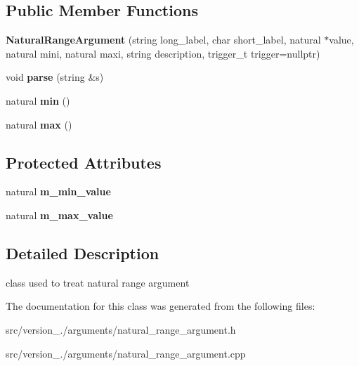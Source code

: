 \subsection*{Public Member Functions}
\begin{DoxyCompactItemize}
\item 
\mbox{\label{classez_1_1arguments_1_1NaturalRangeArgument_a16738801e279e57022d75f1ed6f5dbf3}} 
{\bfseries Natural\+Range\+Argument} (string long\+\_\+label, char short\+\_\+label, natural $\ast$value, natural mini, natural maxi, string description, trigger\+\_\+t trigger=nullptr)
\item 
\mbox{\label{classez_1_1arguments_1_1NaturalRangeArgument_a56ec8cbcb21b96c1594bffa79e44e206}} 
void {\bfseries parse} (string \&s)
\item 
\mbox{\label{classez_1_1arguments_1_1NaturalRangeArgument_aadd923d1d6da5e6cf484f0d1922dde30}} 
natural {\bfseries min} ()
\item 
\mbox{\label{classez_1_1arguments_1_1NaturalRangeArgument_ada5d4bfd607176307753f218190a10c4}} 
natural {\bfseries max} ()
\end{DoxyCompactItemize}
\subsection*{Protected Attributes}
\begin{DoxyCompactItemize}
\item 
\mbox{\label{classez_1_1arguments_1_1NaturalRangeArgument_addc2eab39211438abb76d9e50071f7b8}} 
natural {\bfseries m\+\_\+min\+\_\+value}
\item 
\mbox{\label{classez_1_1arguments_1_1NaturalRangeArgument_a5f0fc979e40fc85b9789368cc4cb93c8}} 
natural {\bfseries m\+\_\+max\+\_\+value}
\end{DoxyCompactItemize}


\subsection{Detailed Description}
class used to treat natural range argument 

The documentation for this class was generated from the following files\+:\begin{DoxyCompactItemize}
\item 
src/version\+\_./arguments/natural\+\_\+range\+\_\+argument.\+h\item 
src/version\+\_./arguments/natural\+\_\+range\+\_\+argument.\+cpp\end{DoxyCompactItemize}
